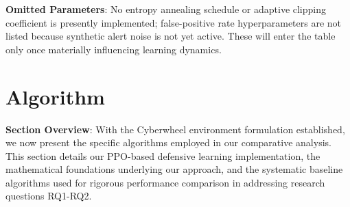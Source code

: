 \documentclass[12pt,oneside,a4paper]{article}
\theoremstyle{definition}
\theoremstyle{plain}
\begin{document}
	\textbf{Omitted Parameters}: No entropy annealing schedule or adaptive clipping coefficient is presently implemented; false-positive rate hyperparameters are not listed because synthetic alert noise is not yet active. These will enter the table only once materially influencing learning dynamics.

\section{Algorithm}

\textbf{Section Overview}: With the Cyberwheel environment formulation established, we now present the specific algorithms employed in our comparative analysis. This section details our PPO-based defensive learning implementation, the mathematical foundations underlying our approach, and the systematic baseline algorithms used for rigorous performance comparison in addressing research questions RQ1-RQ2.
\end{document}

